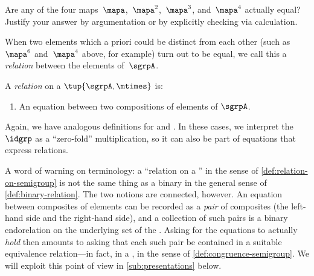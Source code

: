 \begin{gradedexercise}
    \label{ex:CheckRelations}
    Are any of the four maps~$\mapa$,~$\mapa^2$,~$\mapa^3$, and~$\mapa^4$ actually equal?
    Justify your answer by argumentation or by explicitly checking via calculation.
\end{gradedexercise}

When two elements which a priori could be distinct from each other (such as~$\mapa^6$ and~$\mapa^4$ above, for example) turn out to be equal, we call this a \emph{relation} between the elements of~$\sgrpA$.

\begin{ctdefinition}\label{def:relation-on-semigroup}
    A \emph{relation} on a  $\tup{\sgrpA, \mtimes}$ is:

    \constit
    \begin{enumerate}
        \item An equation between two compositions of elements of $\sgrpA$.
    \end{enumerate}
\end{ctdefinition}

\begin{remark}
    Again, we have analogous definitions for  and .
    In these cases, we interpret the  $\idgrp$ as a ``zero-fold'' multiplication, so it can also be part of equations that express relations.
\end{remark}

\begin{remark}
    A word of warning on terminology: a ``relation on a '' in the sense of \cref{def:relation-on-semigroup} is not the same thing as a binary  in the general sense of \cref{def:binary-relation}.
    The two notions are connected, however.
    An equation between composites of elements can be recorded as a \emph{pair} of composites (the left-hand side and the right-hand side), and a collection of such pairs is a binary endorelation on the underlying set of the .
    Asking for the equations to actually \emph{hold} then amounts to asking that each such pair be contained in a suitable equivalence relation---in fact, in a , in the sense of \cref{def:congruence-semigroup}.
    We will exploit this point of view in \cref{sub:presentations} below.
\end{remark}

